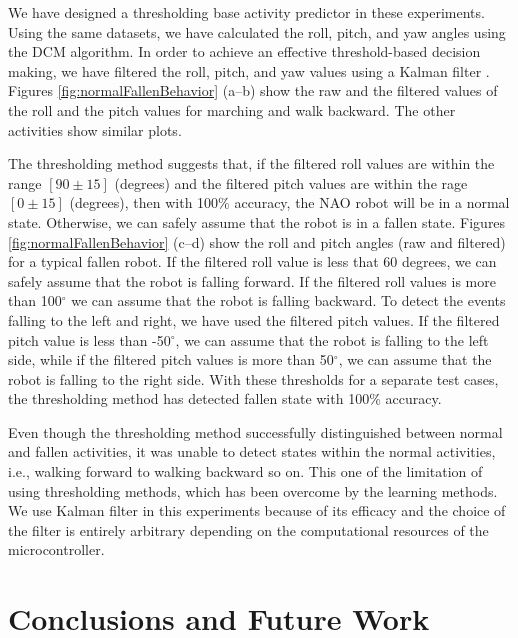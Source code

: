 \documentclass{IEEEtran}
\begin{document}
We have designed a thresholding base activity predictor in these experiments. Using the same 
datasets, we have calculated the roll, pitch, and yaw angles  using the DCM algorithm. In order to 
achieve an effective threshold-based decision making, we have filtered the roll, pitch, and
yaw values using a Kalman filter \cite{Welch:1995:IKF:897831}. Figures 
\ref{fig:normalFallenBehavior} (a--b) show the raw and the filtered values of the roll and the 
pitch values for marching and walk backward. The other activities show similar plots.

The thresholding method suggests that, if the filtered roll values are within the range $[90\pm15]$ 
(degrees) and the filtered pitch values are within the rage $[0\pm15]$ (degrees), then with 100\% 
accuracy, the NAO  robot will be in a normal state. Otherwise, we can safely assume that the robot 
is in a fallen state. Figures \ref{fig:normalFallenBehavior} (c--d) show the roll and pitch 
angles (raw and filtered) for a typical fallen robot. If the filtered roll value is less that 60 
degrees, we can safely assume that the robot is falling forward. If the filtered roll values is 
more than 100$^{\circ}$ we can assume that the robot is falling backward. To detect the events 
falling to the left and right, we have used the filtered pitch values. If the filtered pitch value 
is less than -50$^{\circ}$, we can assume that the robot is falling to the left side, while if the 
filtered pitch values is more than 50$^{\circ}$, we can assume that the robot is falling to the right 
side. With these thresholds for a separate test cases, the thresholding method has detected fallen 
state with 100\% accuracy. 

Even though the thresholding method successfully distinguished between normal and fallen 
activities, it was unable to detect states within the normal activities, i.e., walking forward 
to walking backward so on. This one of the limitation of using thresholding methods, which has 
been overcome by the learning methods.  We use Kalman filter in this experiments because of its 
efficacy and the choice of the filter is entirely arbitrary depending on the computational 
resources of the microcontroller.  


\section{Conclusions and Future Work}
\end{document}
